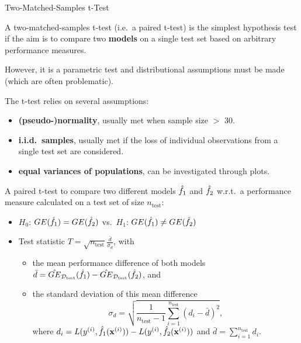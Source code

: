     \begin{frame}[c,allowframebreaks]{Two-Matched-Samples t-Test}

    A two-matched-samples t-test (i.e.\ a paired t-test) is the simplest hypothesis test if the aim is to compare two \textbf{models} on a single test set based on arbitrary performance measures.

    However, it is a parametric test and distributional assumptions must be made (which are often problematic).

    The t-test relies on several assumptions:

    \begin{itemize}
    \item \textbf{(pseudo-)normality}, usually met when sample size $>$ 30.
    \item \textbf{i.i.d.\ samples}, usually met if the loss of individual observations from a single test set are considered. %
    \item \textbf{equal variances of populations}, can be investigated through plots.
    \end{itemize}

    \framebreak

    A paired t-test to compare two different models $\hat{f}_1$ and $\hat{f}_2$ w.r.t.\ a performance measure calculated on a test set of size $n_{\text{test}}$:

    \begin{itemize}
    \item $H_0$: $GE(\hat{f}_{1}) = GE(\hat{f}_{2})$ vs.\ $H_1$: $GE(\hat{f}_{1}) \neq GE(\hat{f}_{2})$
    \item Test statistic $T = \sqrt{n_{\text{test}}} \frac{\bar{d}}{\sigma_{d}}$, with
    \begin{itemize}
    \item the mean performance difference of both models
        $\bar{d} = \hat{GE}_{\mathcal{D}_{\text{test}}}(\hat{f}_{1}) - \hat{GE}_{\mathcal{D}_{\text{test}}}(\hat{f}_{2})$, and
    \item the standard deviation of this mean difference
    $$\sigma_{d} = \sqrt{\frac{1}{n_{\text{test}} - 1}\sum_{i=1}^{n_{\text{test}}} \left(d_i - \bar{d} \right)^2},$$
    where $d_i = L(y^{(i)}, \hat{f}_1 (\mathbf{x}^{(i)})) - L(y^{(i)}, \hat{f}_2 (\mathbf{x}^{(i)}))$ and $\bar{d} = \sum\limits_{i=1}^{n_{\text{test}}} d_i$.
    \end{itemize}
    \end{itemize}


\end{frame}
